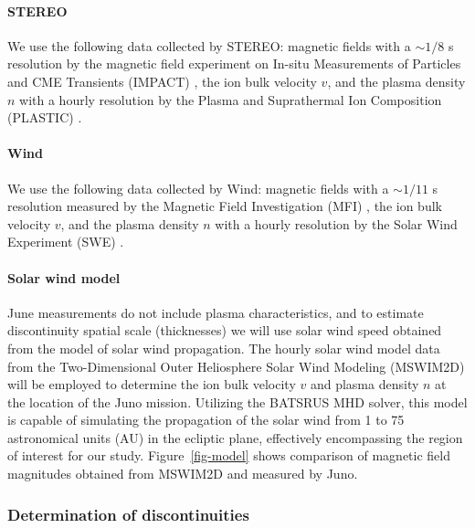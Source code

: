 \documentclass[
  letterpaper,
  DIV=11,
  numbers=noendperiod]{scrartcl}
\let\oldparagraph\paragraph
\renewcommand{\paragraph}[1]{\oldparagraph{#1}\mbox{}}
\begin{document}
\paragraph{STEREO}\label{stereo}

We use the following data collected by STEREO: magnetic ﬁelds with a
\(\sim1/8\) s resolution by the magnetic ﬁeld experiment
\citep{acuña2008} on In-situ Measurements of Particles and CME
Transients (IMPACT) \citep{luhmann2008}, the ion bulk velocity \(v\),
and the plasma density \(n\) with a hourly resolution by the Plasma and
Suprathermal Ion Composition (PLASTIC) \citep{galvin2008}.

\paragraph{Wind}\label{wind}

We use the following data collected by Wind: magnetic ﬁelds with a
\(\sim 1/11\) s resolution measured by the Magnetic Field Investigation
(MFI) \citep{lepping1995}, the ion bulk velocity \(v\), and the plasma
density \(n\) with a hourly resolution by the Solar Wind Experiment
(SWE) \citep{ogilvie1995}.

\paragraph{Solar wind model}\label{solar-wind-model}

June measurements do not include plasma characteristics, and to estimate
discontinuity spatial scale (thicknesses) we will use solar wind speed
obtained from the model of solar wind propagation. The hourly solar wind
model data from the Two-Dimensional Outer Heliosphere Solar Wind
Modeling (MSWIM2D) \citep{keebler2022} will be employed to determine the
ion bulk velocity \(v\) and plasma density \(n\) at the location of the
Juno mission. Utilizing the BATSRUS MHD solver, this model is capable of
simulating the propagation of the solar wind from 1 to 75 astronomical
units (AU) in the ecliptic plane, effectively encompassing the region of
interest for our study. Figure~\ref{fig-model} shows comparison of
magnetic field magnitudes obtained from MSWIM2D and measured by Juno.

\subsubsection{Determination of
discontinuities}\label{determination-of-discontinuities}
\end{document}
